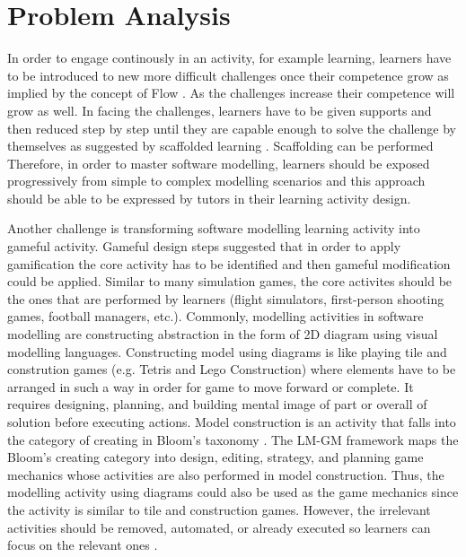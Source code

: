 \documentclass[conference]{IEEEtran}
\begin{document}
\section{Problem Analysis}
\label{Problem Analysis}
In order to engage continously in an activity, for example learning, learners have to be introduced to new more difficult challenges once their competence grow as implied by the concept of Flow \cite{csikszentmihalyi2014toward}. As the challenges increase their competence will grow as well. In facing the challenges, learners have to be given supports and then reduced step by step until they are capable enough to solve the challenge by themselves as suggested by scaffolded learning \cite{wood1976role, vygotsky1978mind}. Scaffolding can be  performed Therefore, in order to master software modelling, learners should be exposed progressively from simple to complex modelling scenarios and this approach should be able to be expressed by tutors in their learning activity design. 

Another challenge is transforming software modelling learning activity into gameful activity. Gameful design steps \cite{deterding2015lens} suggested that in order to apply gamification the core activity has to be identified and then gameful modification could be applied. Similar to many simulation games, the core activites should be the ones that are performed by learners (flight simulators, first-person shooting games, football managers, etc.). Commonly, modelling activities in software modelling are constructing abstraction in the form of 2D diagram using visual modelling languages. Constructing model using diagrams is like playing tile and constrution games (e.g. Tetris and Lego Construction) where elements have to be arranged in such a way in order for game to move forward or complete. It requires designing, planning, and building mental image of part or overall of solution before executing actions. Model construction is an activity that falls into the category of creating in Bloom's taxonomy \cite{krathwohl2002revision}. The LM-GM framework \cite{arnab2015mapping} maps the Bloom's creating category into design, editing, strategy, and planning game mechanics whose activities are also performed in model construction. Thus, the modelling activity using diagrams could also be used as the game mechanics since the activity is similar to tile and construction games. However, the irrelevant activities should be removed, automated, or already executed so learners can focus on the relevant ones \cite{deterding2015lens}.
\end{document}

